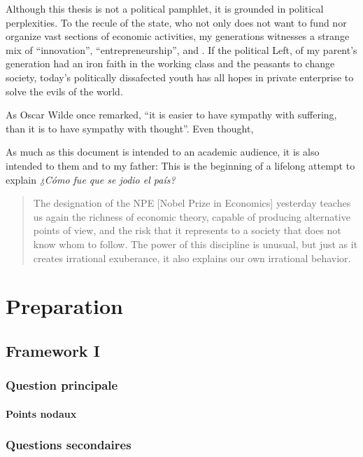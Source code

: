 \documentclass[paper=A4,portrait,twoside=true,twocolumn=false,headinclude=false,footinclude=false,fontsize=11,BCOR=15mm,DIV=calc,pagesize=auto,titlepage=firstiscover,mpinclude=true,headings=normal,headings=twolinechapter,open=right,chapterprefix=false,headsepline=false,parskip=full]{scrbook}
\begin{document}
Although this thesis is not a political pamphlet, it is grounded in
political perplexities. To the recule of the state, who not only does not
want to fund nor organize vast sections of economic activities, my
generations witnesses a strange mix of ``innovation'',
``entrepreneurship'', and . If the political Left, of my parent's
generation had an iron faith in the working class and the peasants to
change society, today's politically dissafected youth has all hopes in
private enterprise to solve the evils of the world.

As Oscar Wilde once remarked, ``it is easier to have sympathy with
suffering, than it is to have sympathy with thought''. Even thought,


As much as this document is intended to an academic audience, it is also
intended to them and to my father: This is the beginning of a lifelong
attempt to explain \emph{¿Cómo fue que se jodio el país?} 

\blockcquote{Alvarez2013}{The designation of the NPE [Nobel Prize in Economics] yesterday teaches us again the richness of economic theory, capable of producing  alternative points of view, and the risk that it represents to a society that does not know whom to follow. The power of this discipline is unusual, but just as it creates irrational exuberance, it also explains our own irrational behavior.}



\lipsum

\mainmatter
\pagestyle{scrheadings}
\part{Preparation}
\label{sec:orge4b1c26}
\chapter{Framework I}
\label{sec:orga1f23c4}
\section{Question principale}
\label{sec:org335d1b7}
\subsection{Points nodaux}
\label{sec:orga63ec69}
\section{Questions secondaires}
\label{sec:org4fcf354}
\end{document}
